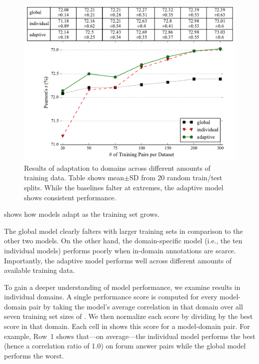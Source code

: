 \begin{figure}[t]
\centering
\includegraphics[scale=0.47]{2016_naacl_stsdomain/figures/sts_da_results.pdf}
\caption{
	Results of adaptation to \sts{} domains across
	different amounts of training data.
	Table shows mean$\pm$SD from 20 random train/test splits.
    While the baselines falter at extremes,
    the adaptive model shows consistent performance.
}
\label{figure:sts-da-results}
\end{figure}


 shows how models adapt as the training set grows.


The global model clearly falters with larger training sets in
comparison to the other two models.  On the other hand, the
domain-specific model (i.e., the ten individual models) performs
poorly when in-domain annotations are scarce.  Importantly, the
adaptive model performs well across different amounts of available
training data.

To gain a deeper understanding of model performance, we examine results in
individual domains.  A single performance score is computed for every model-domain pair
by taking the model's average correlation in that domain over all seven training set
sizes of .
We then normalize each score by dividing by the best score in that domain.  Each cell
in  shows this score for a
model-domain pair.  For example, Row~1 shows that---on average---the individual
model performs the best (hence a correlation ratio of 1.0) on \qa{} forum answer pairs
while the global model performs the worst.

